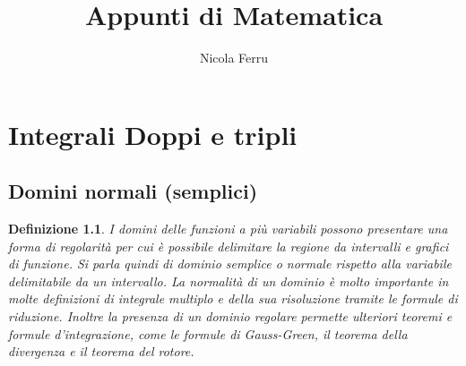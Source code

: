 \documentclass{book}
\title{Appunti di Matematica}
\author{Nicola Ferru}
\date{}
\newtheorem{defi}{Definizione}
\begin{document}


\tableofcontents
\listoftables
\listoffigures






\chapter{Integrali Doppi e tripli}
\section{Domini normali (semplici)}
\begin{defi}
	I domini delle funzioni a più variabili possono presentare una forma di
	regolarità per cui è possibile delimitare la regione da intervalli e grafici
	di funzione. Si parla quindi di dominio semplice o normale rispetto alla
	variabile delimitabile da un intervallo. La normalità di un dominio è molto
	importante in molte definizioni di integrale multiplo e della sua
	risoluzione tramite le formule di riduzione. Inoltre la presenza di un
	dominio regolare permette ulteriori teoremi e formule d'integrazione, come
	le formule di Gauss-Green, il teorema della divergenza e il teorema del
	rotore.
\end{defi}
\end{document}

